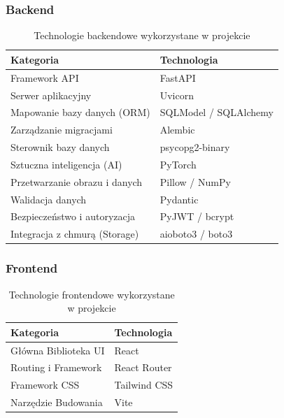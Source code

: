 \documentclass[12pt,a4paper]{article}
\begin{document}
\subsubsection{Backend}
\begin{table}[H]
\centering
    \begin{tabularx}{\textwidth}{l X}
    \toprule
    \textbf{Kategoria} & \textbf{Technologia} \\
    \midrule
        Framework API & FastAPI \\
        Serwer aplikacyjny & Uvicorn \\
        Mapowanie bazy danych (ORM) & SQLModel / SQLAlchemy \\
        Zarządzanie migracjami & Alembic \\
        Sterownik bazy danych & psycopg2-binary \\
        Sztuczna inteligencja (AI) & PyTorch \\
        Przetwarzanie obrazu i danych & Pillow / NumPy \\
        Walidacja danych & Pydantic \\
        Bezpieczeństwo i autoryzacja & PyJWT / bcrypt \\
        Integracja z chmurą (Storage) & aioboto3 / boto3 \\
    \bottomrule
    \end{tabularx}
\caption{Technologie backendowe wykorzystane w projekcie}
\label{tab:tech_backend}
\end{table}

\subsubsection{Frontend}
\begin{table}[H]
\centering
    \begin{tabularx}{\textwidth}{l X}
    \toprule
    \textbf{Kategoria} & \textbf{Technologia} \\
    \midrule
        Główna Biblioteka UI & React \\
        Routing i Framework & React Router \\
        Framework CSS  & Tailwind CSS \\
        Narzędzie Budowania & Vite \\
    \bottomrule
    \end{tabularx}
\caption{Technologie frontendowe wykorzystane w projekcie}
\label{tab:tech_frontend}
\end{table}
\end{document}
